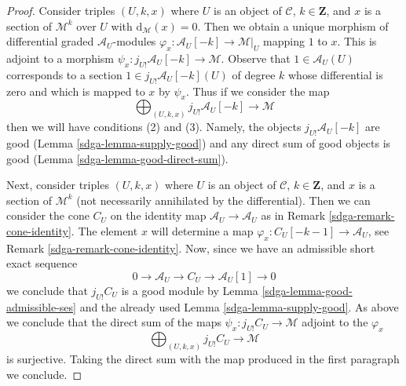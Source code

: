 \begin{proof}

Consider triples $(U, k, x)$ where $U$ is an object of $\mathcal{C}$,
$k \in \mathbf{Z}$, and $x$ is a section of $\mathcal{M}^k$ over $U$
with $\text{d}_\mathcal{M}(x) = 0$. Then we obtain a unique morphism
of differential graded $\mathcal{A}_U$-modules
$\varphi_x : \mathcal{A}_U[-k] \to \mathcal{M}|_U$
mapping $1$ to $x$. This is adjoint to a morphism
$\psi_x : j_{U!}\mathcal{A}_U[-k] \to \mathcal{M}$.
Observe that $1 \in \mathcal{A}_U(U)$ corresponds to
a section $1 \in j_{U!}\mathcal{A}_U[-k](U)$ of degree $k$
whose differential is zero and which is mapped to $x$ by $\psi_x$.
Thus if we consider the map
$$
\bigoplus\nolimits_{(U, k, x)} j_{U!}\mathcal{A}_U[-k]
\longrightarrow
\mathcal{M}
$$
then we will have conditions (2) and (3). Namely, the objects
$j_{U!}\mathcal{A}_U[-k]$ are good (Lemma \ref{sdga-lemma-supply-good})
and any direct sum of good objects is good (Lemma \ref{sdga-lemma-good-direct-sum}).

\medskip\noindent
Next, consider triples $(U, k, x)$ where $U$ is an object of $\mathcal{C}$,
$k \in \mathbf{Z}$, and $x$ is a section of $\mathcal{M}^k$ (not necessarily
annihilated by the differential). Then we can consider
the cone $C_U$ on the identity map $\mathcal{A}_U \to \mathcal{A}_U$
as in Remark \ref{sdga-remark-cone-identity}. The element $x$ will determine a map
$\varphi_x : C_U[-k - 1] \to \mathcal{A}_U$, see
Remark \ref{sdga-remark-cone-identity}. Now, since we have
an admissible short exact sequence
$$
0 \to \mathcal{A}_U \to C_U \to \mathcal{A}_U[1] \to 0
$$
we conclude that $j_{U!}C_U$ is a good module by
Lemma \ref{sdga-lemma-good-admissible-ses} and
the already used Lemma \ref{sdga-lemma-supply-good}.
As above we conclude that the direct sum of the maps
$\psi_x : j_{U!}C_U \to \mathcal{M}$ adjoint to the $\varphi_x$
$$
\bigoplus\nolimits_{(U, k, x)} j_{U!}C_U \longrightarrow \mathcal{M}
$$
is surjective. Taking the direct sum with the map produced
in the first paragraph we conclude.
\end{proof}

